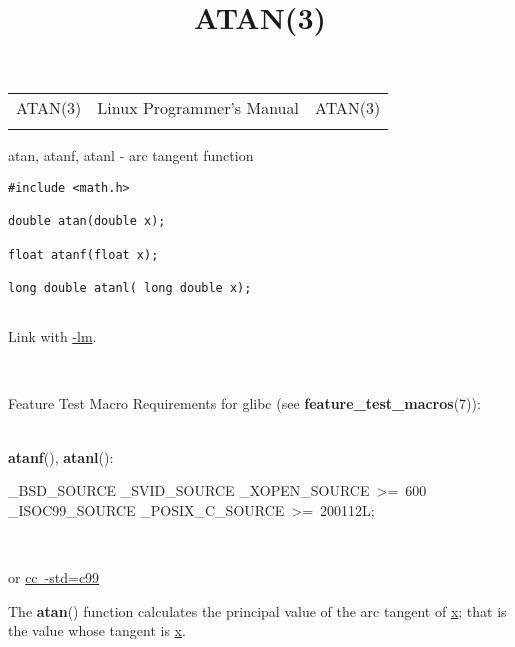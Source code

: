 \documentclass[]{article}
\title{ATAN(3)}
\author{}
\date{}
\let\realtextbf=\textbf
\renewcommand{\textbf}[1]{\textcolor{boldcolor}{\realtextbf{#1}}}
\renewcommand{\emph}[1]{\underline{#1}}
\begin{document}
\maketitle

\begin{longtable}[c]{@{}lll@{}}
\toprule\addlinespace
ATAN(3) & Linux Programmer's Manual & ATAN(3)
\\\addlinespace
\bottomrule
\end{longtable}


atan, atanf, atanl - arc tangent function


\begin{verbatim}
#include <math.h>
 
double atan(double x);
 
float atanf(float x);
 
long double atanl( long double x);
 
\end{verbatim}

Link with \emph{-lm}.

~

Feature Test Macro Requirements for glibc (see
\textbf{feature\_test\_macros}(7)): \\

~

\textbf{atanf}(), \textbf{atanl}():

\_BSD\_SOURCE \textbar{}\textbar{} \_SVID\_SOURCE \textbar{}\textbar{}
\_XOPEN\_SOURCE~\textgreater{}=~600 \textbar{}\textbar{}
\_ISOC99\_SOURCE \textbar{}\textbar{}
\_POSIX\_C\_SOURCE~\textgreater{}=~200112L;

~

or \emph{cc~-std=c99}


The \textbf{atan}() function calculates the principal value of the arc
tangent of \emph{x}; that is the value whose tangent is \emph{x}.
\end{document}
